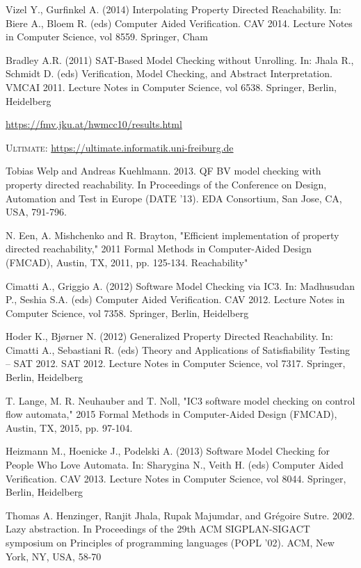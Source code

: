 \documentclass[11pt, a4paper, BCOR=10mm, ngerman, oneside]{scrbook}
\begin{document}
\begin{thebibliography}{999}

 Vizel Y., Gurfinkel A. (2014) Interpolating Property Directed Reachability. In: Biere A., Bloem R. (eds) Computer Aided Verification. CAV 2014. Lecture Notes in Computer Science, vol 8559. Springer, Cham

 Bradley A.R. (2011) SAT-Based Model Checking without Unrolling. In: Jhala R., Schmidt D. (eds) Verification, Model Checking, and Abstract Interpretation. VMCAI 2011. Lecture Notes in Computer Science, vol 6538. Springer, Berlin, Heidelberg

 \url{https://fmv.jku.at/hwmcc10/results.html}

 \textsc{Ultimate}: \url{https://ultimate.informatik.uni-freiburg.de}

 Tobias Welp and Andreas Kuehlmann. 2013. QF BV model checking with property directed reachability. In Proceedings of the Conference on Design, Automation and Test in Europe (DATE '13). EDA Consortium, San Jose, CA, USA, 791-796.


 N. Een, A. Mishchenko and R. Brayton, "Efficient implementation of property directed reachability," 2011 Formal Methods in Computer-Aided Design (FMCAD), Austin, TX, 2011, pp. 125-134.
Reachability"

 Cimatti A., Griggio A. (2012) Software Model Checking via IC3. In: Madhusudan P., Seshia S.A. (eds) Computer Aided Verification. CAV 2012. Lecture Notes in Computer Science, vol 7358. Springer, Berlin, Heidelberg

 Hoder K., Bjørner N. (2012) Generalized Property Directed Reachability. In: Cimatti A., Sebastiani R. (eds) Theory and Applications of Satisfiability Testing – SAT 2012. SAT 2012. Lecture Notes in Computer Science, vol 7317. Springer, Berlin, Heidelberg

 T. Lange, M. R. Neuhauber and T. Noll, "IC3 software model checking on control flow automata," 2015 Formal Methods in Computer-Aided Design (FMCAD), Austin, TX, 2015, pp. 97-104.

 Heizmann M., Hoenicke J., Podelski A. (2013) Software Model Checking for People Who Love Automata. In: Sharygina N., Veith H. (eds) Computer Aided Verification. CAV 2013. Lecture Notes in Computer Science, vol 8044. Springer, Berlin, Heidelberg

 Thomas A. Henzinger, Ranjit Jhala, Rupak Majumdar, and Grégoire Sutre. 2002. Lazy abstraction. In Proceedings of the 29th ACM SIGPLAN-SIGACT symposium on Principles of programming languages (POPL '02). ACM, New York, NY, USA, 58-70

\end{thebibliography}
\end{document}
